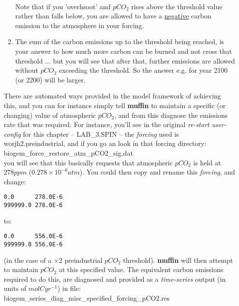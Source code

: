\documentclass[11pt,fleqn]{book} %
\begin{document}
\begin{itemize}[noitemsep]
\begin{enumerate}[noitemsep]
\\Note that if you 'overhsoot' and \(pCO_{2}\) rises above the threshold value rather than falls below, you are allowed to have a \uline{negative} carbon emission to the atmosphere in your forcing.
\item The sum of the carbon emissions up to the threshold being reached, is your answer to how much more carbon can be burned and not cross that threshold ... but you will see that after that, further emissions are allowed without \(pCO_{2}\) exceeding the threshold. So the answer e.g. for year 2100 (or 2200) will be larger.
\end{enumerate}

\vspace{1mm} 
There are automated ways provided in the model framework of  achieving this, and you can for instance simply tell \textbf{muffin}  to maintain a specific (or changing) value of atmospheric \(pCO_{2}\), and from this diagnose the emissions rate that was required. For instance, you'll see in the original \textit{re-start} \textit{user-config} for this chapter -- \textsf{\footnotesize LAB\_3.SPIN} -- the \textit{forcing} used is 
\textsf{\footnotesize worjh2.preindustrial}, and if you go an look in that forcing directory:
\vspace{1mm}
\\\textsf{\footnotesize biogem\_force\_restore\_atm\_pCO2\_sig.dat} 
\vspace{1mm}
\\you will see that this basically requests that atmospheric \(pCO_{2}\) is held at \(278 ppm\) (\(0.278\times10^{-6} atm\)). You could then copy and rename this \textit{forcing}, and change:
\vspace{-2pt}\small\begin{verbatim}
0.0      278.0E-6
999999.0 278.0E-6
\end{verbatim}\normalsize\vspace{-2pt}
to:
\vspace{-2pt}\small\begin{verbatim}
0.0      556.0E-6
999999.0 556.0E-6
\end{verbatim}\normalsize\vspace{-2pt}
(in the case of a \(\times2\) preindustrial \(pCO_{2}\) threshold). \textbf{muffin} will then attempt to maintain \(pCO_{2}\) at this specified value. The equivalent carbon emissions required to do this, are diagnosed and provided as a \textit{time-series} output (in units of \(mol C yr^{-1}\)) in file: \\\textsf{\footnotesize biogem\_series\_diag\_misc\_specified\_forcing\_pCO2.res}


\end{itemize}
\end{document}
